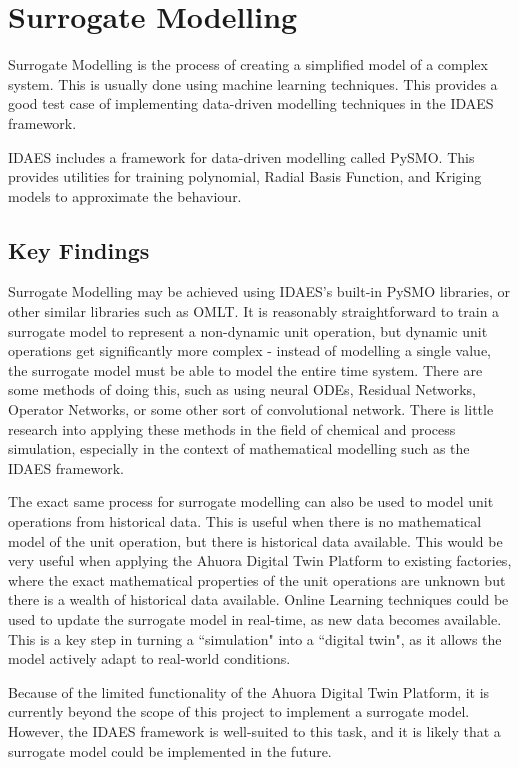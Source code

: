 \documentclass[12pt]{report}
\begin{document}
\section{Surrogate Modelling}

Surrogate Modelling is the process of creating a simplified model of a complex system. This is usually done using machine learning techniques. This provides a good test case of implementing data-driven modelling techniques in the IDAES framework.

IDAES includes a framework for data-driven modelling called PySMO. This provides utilities for training polynomial, Radial Basis Function, and Kriging models to approximate the behaviour.

\subsection{Key Findings}

Surrogate Modelling may be achieved using IDAES's built-in PySMO libraries, or other similar libraries such as OMLT. It is reasonably straightforward to train a surrogate model to represent a non-dynamic unit operation, but dynamic unit operations get significantly more complex - instead of modelling a single value, the surrogate model must be able to model the entire time system. There are some methods of doing this, such as using neural ODEs, Residual Networks, Operator Networks, or some other sort of convolutional network. There is little research into applying these methods in the field of chemical and process simulation, especially in the context of mathematical modelling such as the IDAES framework.

The exact same process for surrogate modelling can also be used to model unit operations from historical data. This is useful when there is no mathematical model of the unit operation, but there is historical data available. This would be very useful when applying the Ahuora Digital Twin Platform to existing factories, where the exact mathematical properties of the unit operations are unknown but there is a wealth of historical data available. Online Learning techniques could be used to update the surrogate model in real-time, as new data becomes available. This is a key step in turning a ``simulation" into a ``digital twin", as it allows the model actively adapt to real-world conditions.

Because of the limited functionality of the Ahuora Digital Twin Platform, it is currently beyond the scope of this project to implement a surrogate model. However, the IDAES framework is well-suited to this task, and it is likely that a surrogate model could be implemented in the future.
\end{document}
